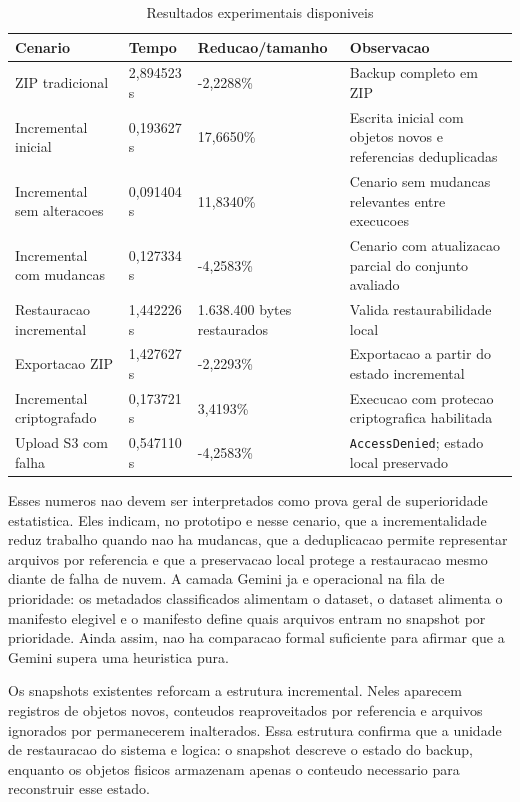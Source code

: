 \documentclass[12pt,a4paper]{article}
\begin{document}
\begin{table}[h]
\centering
\caption{Resultados experimentais disponiveis}
\begin{tabular}{L{0.26\textwidth}L{0.18\textwidth}L{0.18\textwidth}L{0.26\textwidth}}
\toprule
Cenario & Tempo & Reducao/tamanho & Observacao \\
\midrule
ZIP tradicional & 2,894523 s & -2,2288\% & Backup completo em ZIP \\
Incremental inicial & 0,193627 s & 17,6650\% & Escrita inicial com objetos novos e referencias deduplicadas \\
Incremental sem alteracoes & 0,091404 s & 11,8340\% & Cenario sem mudancas relevantes entre execucoes \\
Incremental com mudancas & 0,127334 s & -4,2583\% & Cenario com atualizacao parcial do conjunto avaliado \\
Restauracao incremental & 1,442226 s & 1.638.400 bytes restaurados & Valida restaurabilidade local \\
Exportacao ZIP & 1,427627 s & -2,2293\% & Exportacao a partir do estado incremental \\
Incremental criptografado & 0,173721 s & 3,4193\% & Execucao com protecao criptografica habilitada \\
Upload S3 com falha & 0,547110 s & -4,2583\% & \texttt{AccessDenied}; estado local preservado \\
\bottomrule
\end{tabular}
\end{table}

Esses numeros nao devem ser interpretados como prova geral de superioridade estatistica. Eles indicam, no prototipo e nesse cenario, que a incrementalidade reduz trabalho quando nao ha mudancas, que a deduplicacao permite representar arquivos por referencia e que a preservacao local protege a restauracao mesmo diante de falha de nuvem. A camada Gemini ja e operacional na fila de prioridade: os metadados classificados alimentam o dataset, o dataset alimenta o manifesto elegivel e o manifesto define quais arquivos entram no snapshot por prioridade. Ainda assim, nao ha comparacao formal suficiente para afirmar que a Gemini supera uma heuristica pura.

Os snapshots existentes reforcam a estrutura incremental. Neles aparecem registros de objetos novos, conteudos reaproveitados por referencia e arquivos ignorados por permanecerem inalterados. Essa estrutura confirma que a unidade de restauracao do sistema e logica: o snapshot descreve o estado do backup, enquanto os objetos fisicos armazenam apenas o conteudo necessario para reconstruir esse estado.
\end{document}
